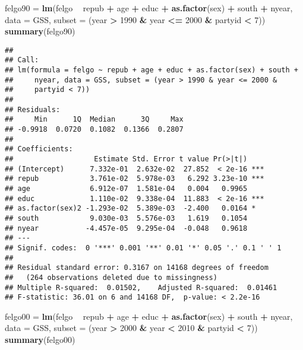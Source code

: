 \documentclass[]{article}
\newenvironment{Shaded}{\begin{snugshade}}{\end{snugshade}}
\newcommand{\DataTypeTok}[1]{\textcolor[rgb]{0.13,0.29,0.53}{#1}}
\newcommand{\DecValTok}[1]{\textcolor[rgb]{0.00,0.00,0.81}{#1}}
\newcommand{\KeywordTok}[1]{\textcolor[rgb]{0.13,0.29,0.53}{\textbf{#1}}}
\newcommand{\NormalTok}[1]{#1}
\newcommand{\OperatorTok}[1]{\textcolor[rgb]{0.81,0.36,0.00}{\textbf{#1}}}
\newcommand{\StringTok}[1]{\textcolor[rgb]{0.31,0.60,0.02}{#1}}
\begin{document}
\begin{Shaded}
\begin{Highlighting}[]
\NormalTok{felgo90 =}\StringTok{ }\KeywordTok{lm}\NormalTok{(felgo }\OperatorTok{~}\StringTok{ }\NormalTok{repub }\OperatorTok{+}\StringTok{ }\NormalTok{age }\OperatorTok{+}\StringTok{ }\NormalTok{educ }\OperatorTok{+}\StringTok{ }\KeywordTok{as.factor}\NormalTok{(sex) }\OperatorTok{+}\StringTok{ }\NormalTok{south }\OperatorTok{+}\StringTok{ }\NormalTok{nyear, }\DataTypeTok{data =}\NormalTok{ GSS, }\DataTypeTok{subset =}\NormalTok{ (year }\OperatorTok{>}\StringTok{ }\DecValTok{1990} \OperatorTok{&}\StringTok{ }\NormalTok{year }\OperatorTok{<=}\StringTok{ }\DecValTok{2000} \OperatorTok{&}\StringTok{ }\NormalTok{partyid }\OperatorTok{<}\StringTok{ }\DecValTok{7}\NormalTok{))}
\KeywordTok{summary}\NormalTok{(felgo90)}
\end{Highlighting}
\end{Shaded}

\begin{verbatim}
## 
## Call:
## lm(formula = felgo ~ repub + age + educ + as.factor(sex) + south + 
##     nyear, data = GSS, subset = (year > 1990 & year <= 2000 & 
##     partyid < 7))
## 
## Residuals:
##     Min      1Q  Median      3Q     Max 
## -0.9918  0.0720  0.1082  0.1366  0.2807 
## 
## Coefficients:
##                   Estimate Std. Error t value Pr(>|t|)    
## (Intercept)      7.332e-01  2.632e-02  27.852  < 2e-16 ***
## repub            3.761e-02  5.978e-03   6.292 3.23e-10 ***
## age              6.912e-07  1.581e-04   0.004   0.9965    
## educ             1.110e-02  9.338e-04  11.883  < 2e-16 ***
## as.factor(sex)2 -1.293e-02  5.389e-03  -2.400   0.0164 *  
## south            9.030e-03  5.576e-03   1.619   0.1054    
## nyear           -4.457e-05  9.295e-04  -0.048   0.9618    
## ---
## Signif. codes:  0 '***' 0.001 '**' 0.01 '*' 0.05 '.' 0.1 ' ' 1
## 
## Residual standard error: 0.3167 on 14168 degrees of freedom
##   (264 observations deleted due to missingness)
## Multiple R-squared:  0.01502,    Adjusted R-squared:  0.01461 
## F-statistic: 36.01 on 6 and 14168 DF,  p-value: < 2.2e-16
\end{verbatim}

\begin{Shaded}
\begin{Highlighting}[]
\NormalTok{felgo00 =}\StringTok{ }\KeywordTok{lm}\NormalTok{(felgo }\OperatorTok{~}\StringTok{ }\NormalTok{repub }\OperatorTok{+}\StringTok{ }\NormalTok{age }\OperatorTok{+}\StringTok{ }\NormalTok{educ }\OperatorTok{+}\StringTok{ }\KeywordTok{as.factor}\NormalTok{(sex) }\OperatorTok{+}\StringTok{ }\NormalTok{south }\OperatorTok{+}\StringTok{ }\NormalTok{nyear, }\DataTypeTok{data =}\NormalTok{ GSS, }\DataTypeTok{subset =}\NormalTok{ (year }\OperatorTok{>}\StringTok{ }\DecValTok{2000} \OperatorTok{&}\StringTok{ }\NormalTok{year }\OperatorTok{<}\StringTok{ }\DecValTok{2010} \OperatorTok{&}\StringTok{ }\NormalTok{partyid }\OperatorTok{<}\StringTok{ }\DecValTok{7}\NormalTok{))}
\KeywordTok{summary}\NormalTok{(felgo00)}
\end{Highlighting}
\end{Shaded}
\end{document}
